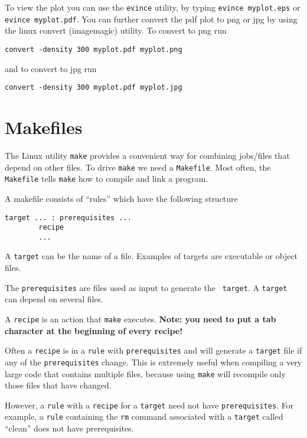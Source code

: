 \documentclass[aps,showpacs,prd,notitlepage,preprintnumbers,amsmath,amssymb,letterpaper]{revtex4}
\begin{document}
To view the plot you can use the {\tt evince} utility, by typing
{\tt evince myplot.eps} or {\tt evince myplot.pdf}. You can further
convert the pdf plot to png or jpg by using the linux convert (imagemagic)
utility. To convert to png run

\begin{verbatim}
convert -density 300 myplot.pdf myplot.png
\end{verbatim}

and to convert to jpg run

\begin{verbatim}
convert -density 300 myplot.pdf myplot.jpg
\end{verbatim}


\section{Makefiles}

The Linux utility {\tt make} provides a convenient way for combining
jobs/files that depend on other files. To drive {\tt make} we need a
{\tt Makefile}. Most often, the {\tt Makefile} tells {\tt make} how to
compile and link a program.

A makefile consists of ``rules'' which have the following structure
%
\begin{verbatim}
target ... : prerequisites ...
        recipe
        ...
\end{verbatim}

A {\tt target} can be the name of a file. Examples of targets are
executable or object files.

The {\tt prerequisites} are files used as input to generate the {\tt
  target}. A {\tt target} can depend on several files.

A {\tt recipe} is an action that {\tt make} executes.
{\bf Note: you need to put a tab character at the beginning of every recipe!}


Often a {\tt recipe} is in a {\tt rule} with {\tt prerequisites} and
will generate a {\tt target} file if any of the {\tt prerequisites}
change. This is extremely useful when compiling a very large code that
contains multiple files, because using {\tt make} will recompile only
those files that have changed.

However, a {\tt rule} with a {\tt recipe} for a {\tt target} need not
have {\tt prerequisites}. For example, a {\tt rule} containing the
{\tt rm} command associated with a {\tt target} called ``clean'' does
not have prerequisites.
\end{document}
